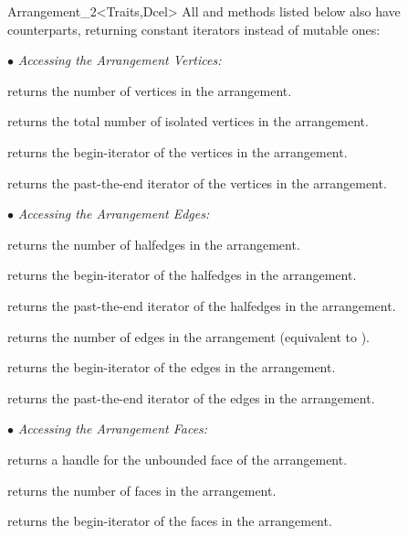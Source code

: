 \begin{ccRefClass}{Arrangement_2<Traits,Dcel>}
All  and  methods listed below also have 
counterparts, returning constant iterators instead of mutable ones:

$\bullet$ {\sl Accessing the Arrangement Vertices:}

    {returns the number of vertices in the arrangement.}

    {returns the total number of isolated vertices in the arrangement.}

    {returns the begin-iterator of the vertices in the arrangement.}
    
    {returns the past-the-end iterator of the vertices in the arrangement.}

$\bullet$ {\sl Accessing the Arrangement Edges:}

    {returns the number of halfedges in the arrangement.}

    {returns the begin-iterator of the halfedges in the arrangement.}
 
    {returns the past-the-end iterator of the halfedges in the arrangement.}

    {returns the number of edges in the arrangement (equivalent to
     ).}

    {returns the begin-iterator of the edges in the arrangement.}
 
    {returns the past-the-end iterator of the edges in the arrangement.}

$\bullet$ {\sl Accessing the Arrangement Faces:}

    {returns a handle for the unbounded face of the arrangement.}

    {returns the number of faces in the arrangement.}

    {returns the begin-iterator of the faces in the arrangement.}
    

\end{ccRefClass}
